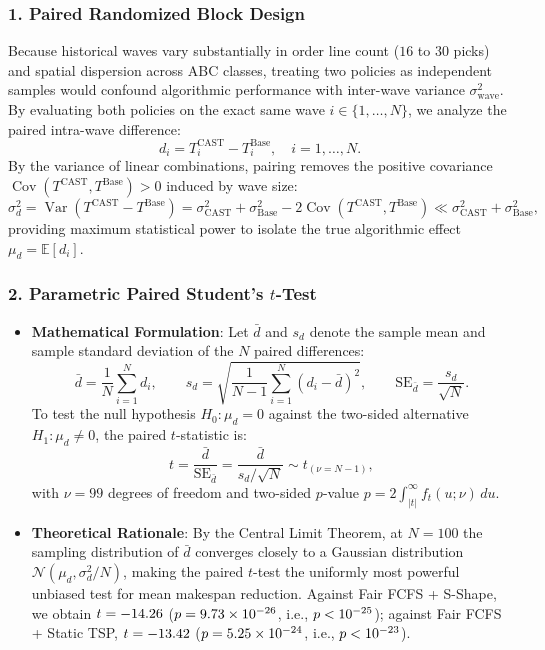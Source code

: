 \documentclass[11pt,a4paper]{article}
\begin{document}
\subsubsection{1. Paired Randomized Block Design}
Because historical waves vary substantially in order line count ($16$ to $30$ picks) and spatial dispersion across ABC classes, treating two policies as independent samples would confound algorithmic performance with inter-wave variance $\sigma_{\text{wave}}^2$. By evaluating both policies on the exact same wave $i \in \{1, \dots, N\}$, we analyze the paired intra-wave difference:
\begin{equation}
    d_i = T_i^{\text{CAST}} - T_i^{\text{Base}}, \quad i = 1, \dots, N.
\end{equation}
By the variance of linear combinations, pairing removes the positive covariance $\operatorname{Cov}(T^{\text{CAST}}, T^{\text{Base}}) > 0$ induced by wave size:
\begin{equation}
    \sigma_d^2 = \operatorname{Var}(T^{\text{CAST}} - T^{\text{Base}}) = \sigma_{\text{CAST}}^2 + \sigma_{\text{Base}}^2 - 2\operatorname{Cov}(T^{\text{CAST}}, T^{\text{Base}}) \ll \sigma_{\text{CAST}}^2 + \sigma_{\text{Base}}^2,
\end{equation}
providing maximum statistical power to isolate the true algorithmic effect $\mu_d = \mathbb{E}[d_i]$.

\subsubsection{2. Parametric Paired Student's $t$-Test}
\begin{itemize}[leftmargin=*]
    \item \textbf{Mathematical Formulation}: Let $\bar{d}$ and $s_d$ denote the sample mean and sample standard deviation of the $N$ paired differences:
    \begin{equation}
        \bar{d} = \frac{1}{N}\sum_{i=1}^N d_i, \qquad s_d = \sqrt{\frac{1}{N - 1}\sum_{i=1}^N (d_i - \bar{d})^2}, \qquad \text{SE}_{\bar{d}} = \frac{s_d}{\sqrt{N}}.
    \end{equation}
    To test the null hypothesis $H_0: \mu_d = 0$ against the two-sided alternative $H_1: \mu_d \neq 0$, the paired $t$-statistic is:
    \begin{equation}
        t = \frac{\bar{d}}{\text{SE}_{\bar{d}}} = \frac{\bar{d}}{s_d / \sqrt{N}} \sim t_{(\nu = N - 1)},
    \end{equation}
    with $\nu = 99$ degrees of freedom and two-sided $p$-value $p = 2 \int_{|t|}^{\infty} f_{t}(u; \nu)\,du$.
    \item \textbf{Theoretical Rationale}: By the Central Limit Theorem, at $N = 100$ the sampling distribution of $\bar{d}$ converges closely to a Gaussian distribution $\mathcal{N}(\mu_d, \sigma_d^2 / N)$, making the paired $t$-test the uniformly most powerful unbiased test for mean makespan reduction. Against Fair FCFS + S-Shape, we obtain $t = -14.26$ ($p = 9.73 \times 10^{-26}$, i.e., $p < 10^{-25}$); against Fair FCFS + Static TSP, $t = -13.42$ ($p = 5.25 \times 10^{-24}$, i.e., $p < 10^{-23}$).
\end{itemize}
\end{document}
